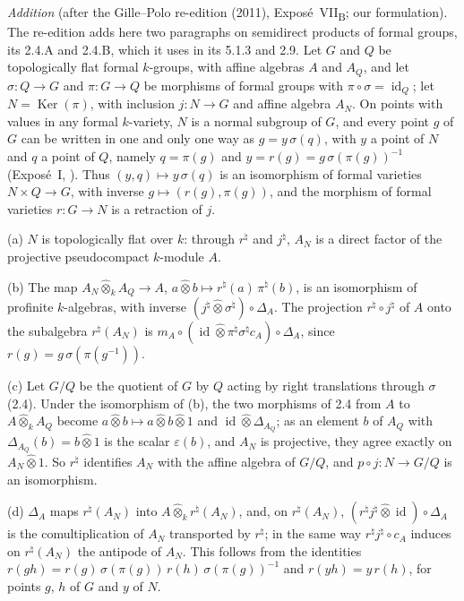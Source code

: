
\medskip\noindent
{}
\label{sga3:VIIB:2.4.A}%
\emph{Addition} (after the Gille--Polo re-edition (2011),
Exposé~VII\textsubscript{B}; our formulation). The re-edition adds here two
paragraphs on semidirect products of formal groups, its 2.4.A and 2.4.B,
which it uses in its 5.1.3 and 2.9. Let \(G\) and \(Q\) be topologically
flat formal \(k\)-groups, with affine algebras \(A\) and \(A_Q\), and let
\(\sigma:Q\to G\) and \(\pi:G\to Q\) be morphisms of formal groups with
\(\pi\circ\sigma=\operatorname{id}_Q\); let \(N=\operatorname{Ker}(\pi)\),
with inclusion \(j:N\to G\) and affine algebra \(A_N\). On points with
values in any formal \(k\)-variety, \(N\) is a normal subgroup of \(G\),
and every point \(g\) of \(G\) can be written in one and only one way as
\(g=y\,\sigma(q)\), with \(y\) a point of \(N\) and \(q\) a point of
\(Q\), namely \(q=\pi(g)\) and \(y=r(g)=g\,\sigma(\pi(g))^{-1}\)
\textup{(Exposé~I, )}. Thus
\((y,q)\mapsto y\,\sigma(q)\) is an isomorphism of formal varieties
\(N\times Q\to G\), with inverse \(g\mapsto(r(g),\pi(g))\), and the
morphism of formal varieties \(r:G\to N\) is a retraction of \(j\).

\textup{(a)} \(N\) is topologically flat over \(k\): through
\(r^\natural\) and \(j^\natural\), \(A_N\) is a direct factor of the
projective pseudocompact \(k\)-module \(A\).

\textup{(b)} The map \(A_N\widehat\otimes_kA_Q\to A\),
\(a\widehat\otimes b\mapsto r^\natural(a)\,\pi^\natural(b)\), is an
isomorphism of profinite \(k\)-algebras, with inverse
\((j^\natural\widehat\otimes\sigma^\natural)\circ\Delta_A\). The
projection \(r^\natural\circ j^\natural\) of \(A\) onto the subalgebra
\(r^\natural(A_N)\) is
\(m_A\circ(\operatorname{id}\widehat\otimes\pi^\natural\sigma^\natural c_A)\circ\Delta_A\),
since \(r(g)=g\,\sigma(\pi(g^{-1}))\).

\textup{(c)} Let \(G/Q\) be the quotient of \(G\) by \(Q\) acting by right
translations through \(\sigma\) \textup{(2.4)}. Under the isomorphism of
\textup{(b)}, the two morphisms of 2.4 from \(A\) to
\(A\widehat\otimes_kA_Q\) become
\(a\widehat\otimes b\mapsto a\widehat\otimes b\widehat\otimes1\) and
\(\operatorname{id}\widehat\otimes\Delta_{A_Q}\); as an element \(b\) of
\(A_Q\) with \(\Delta_{A_Q}(b)=b\widehat\otimes1\) is the scalar
\(\varepsilon(b)\), and \(A_N\) is projective, they agree exactly on
\(A_N\widehat\otimes1\). So \(r^\natural\) identifies \(A_N\) with the
affine algebra of \(G/Q\), and \(p\circ j:N\to G/Q\) is an isomorphism.

\textup{(d)} \(\Delta_A\) maps \(r^\natural(A_N)\) into
\(A\widehat\otimes_kr^\natural(A_N)\), and, on \(r^\natural(A_N)\),
\((r^\natural j^\natural\widehat\otimes\operatorname{id})\circ\Delta_A\)
is the comultiplication of \(A_N\) transported by \(r^\natural\); in the
same way \(r^\natural j^\natural\circ c_A\) induces on \(r^\natural(A_N)\)
the antipode of \(A_N\). This follows from the identities
\(r(gh)=r(g)\,\sigma(\pi(g))\,r(h)\,\sigma(\pi(g))^{-1}\) and
\(r(yh)=y\,r(h)\), for points \(g\), \(h\) of \(G\) and \(y\) of \(N\).
